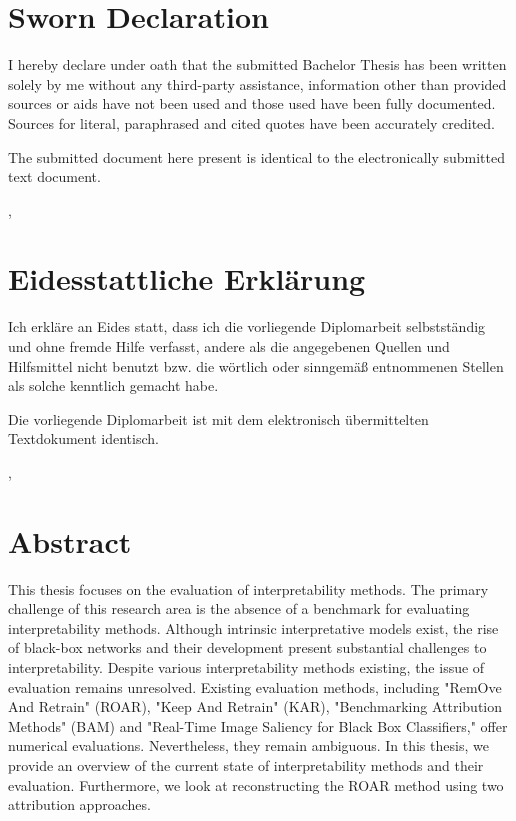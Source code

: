 
	\ifeng \chapter*{Sworn Declaration}
	I hereby declare under oath that the submitted Bachelor Thesis has been written solely by me without any third-party assistance, information other than provided sources or aids have not been used and those used have been fully documented. Sources for literal, paraphrased and cited quotes have been accurately credited.

	The submitted document here present is identical to the electronically submitted text document.

	\vskip1cm
	\place, \date

	\else \chapter*{Eidesstattliche Erklärung}
	Ich erkläre an Eides statt, dass ich die vorliegende Diplomarbeit selbstständig und ohne fremde Hilfe verfasst, andere als die angegebenen Quellen und Hilfsmittel nicht benutzt bzw. die wörtlich oder sinngemäß entnommenen Stellen als solche kenntlich gemacht habe.

	Die vorliegende Diplomarbeit ist mit dem elektronisch übermittelten Textdokument identisch.

	\vskip1cm
	\place, \date
	\fi

		\chapter*{Abstract}

	This thesis focuses on the evaluation of interpretability methods. The primary challenge of this research area is the absence of a benchmark for evaluating interpretability methods. Although intrinsic interpretative models exist, the rise of black-box networks and their development present substantial challenges to interpretability. Despite various interpretability methods existing, the issue of evaluation remains unresolved. Existing evaluation methods, including "RemOve And Retrain" (ROAR), "Keep And Retrain" (KAR), "Benchmarking Attribution Methods" (BAM) and "Real-Time Image Saliency for Black Box Classifiers," offer numerical evaluations. Nevertheless, they remain ambiguous. In this thesis, we provide an overview of the current state of interpretability methods and their evaluation. Furthermore, we look at reconstructing the ROAR method using two attribution approaches.
	
	


